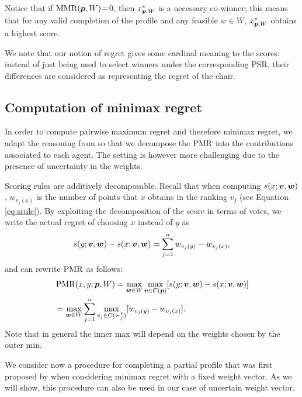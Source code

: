 Notice that if $\operatorname{MMR}({\bm{p}}, W)\!=\!0$, then $x^{*}_{{\bm{p}},W}$  is a necessary co-winner; this means that for any valid completion of the profile and any feasible $w \!\in\! W$, $x^{*}_{{\bm{p}},W}$ obtains a highest score.

We note that our notion of regret gives some cardinal meaning to the scores: instead of just being used to select winners under the corresponding PSR, their differences are considered as representing the regret of the chair.


\subsection{Computation of minimax regret}
In order to compute pairwise maximum regret and therefore minimax regret, we adapt the reasoning from \citet{Lu2011} so that we decompose the $\operatorname{PMR}$ into the contributions associated to each agent.
The setting is however more challenging due to the presence of uncertainty in the weights.

Scoring rules are additively decomposable.
Recall that when computing $s(x; \bm{v}, \bm{w})$, $w_{v_j(x)}$ is the number of points that $x$ obtains in the ranking $v_j$ (see Equation \ref{eq:srule}).
By exploiting the decomposition of the score in terms of votes, we write the actual regret of choosing $x$ instead of $y$ as
\[
s(y; \bm{v},\bm{w}) - s(x; \bm{v}, \bm{w}) = \sum_{j=1}^n w_{v_j(y)} - w_{v_j(x)},
\]
and  can rewrite $\operatorname{PMR}$ as follows:
\begin{align*}
& \operatorname{PMR}(x,y; {\bm{p}}, W) = \max_{\bm{w} \in W} \max_{\bm{v} \in C({\bm{p}})} [ s(y; \bm{v},\bm{w}) - s(x; \bm{v},\bm{w}) ] \\
& =  \max_{\bm{w} \in W} \sum_{j=1}^{n} \max_{v_j \in C(\succ_j^p)} [w_{v_j(y)} - w_{v_j(x)}]. \\
\end{align*}
Note that in general the inner max will depend on the weights chosen by the outer min.

We consider now a procedure for completing a partial profile that was first proposed by \citet{Lu2011} when considering minimax regret with a fixed weight vector.
As we will show, this procedure can also be used in our case of uncertain weight vector.

